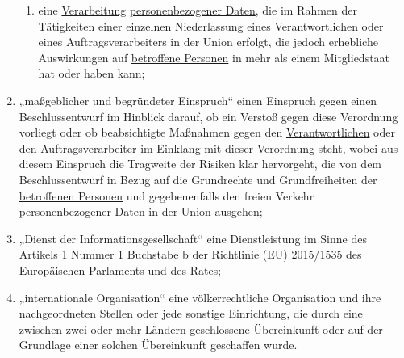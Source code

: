 \begin{enumerate}
\begin{enumerate}
    \item eine \hyperref[itm:04-2]{Verarbeitung} \hyperref[itm:04-1]{personenbezogener Daten}, die im Rahmen der Tätigkeiten einer einzelnen Niederlassung eines
     \hyperref[itm:04-7]{Verantwortlichen} oder eines Auftragsverarbeiters in der Union erfolgt, die jedoch erhebliche Auswirkungen auf
     \hyperref[itm:04-1]{betroffene Personen} in mehr als einem Mitgliedstaat hat oder haben kann;
    \label{itm:04-23b}

  \end{enumerate}

  \item „maßgeblicher und begründeter Einspruch“ einen Einspruch gegen einen Beschlussentwurf im Hinblick darauf, ob ein
   Verstoß gegen diese Verordnung vorliegt oder ob beabsichtigte Maßnahmen gegen den \hyperref[itm:04-7]{Verantwortlichen} oder den
   Auftragsverarbeiter im Einklang mit dieser Verordnung steht, wobei aus diesem Einspruch die Tragweite der Risiken
   klar hervorgeht, die von dem Beschlussentwurf in Bezug auf die Grundrechte und Grundfreiheiten der \hyperref[itm:04-1]{betroffenen
   Personen} und gegebenenfalls den freien Verkehr \hyperref[itm:04-1]{personenbezogener Daten} in der Union ausgehen;
  \label{itm:04-27}
 
  \item „Dienst der Informationsgesellschaft“ eine Dienstleistung im Sinne des Artikels 1 Nummer 1 Buchstabe b der
   Richtlinie (EU) 2015/1535 des Europäischen Parlaments und des Rates;
  \label{itm:04-28}

  \item „internationale Organisation“ eine völkerrechtliche Organisation und ihre nachgeordneten Stellen oder jede
   sonstige Einrichtung, die durch eine zwischen zwei oder mehr Ländern geschlossene Übereinkunft oder auf der
   Grundlage einer solchen Übereinkunft geschaffen wurde.
  \label{itm:04-29}

\end{enumerate}


